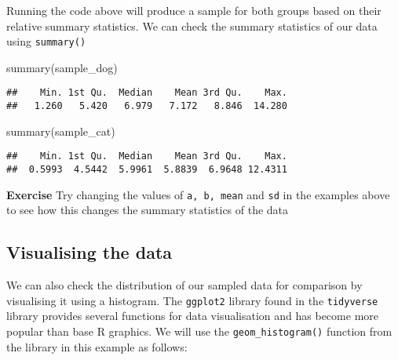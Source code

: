 \documentclass[
]{book}
\newenvironment{Shaded}{\begin{snugshade}}{\end{snugshade}}
\newcommand{\FunctionTok}[1]{\textcolor[rgb]{0.00,0.00,0.00}{#1}}
\newcommand{\NormalTok}[1]{#1}
\begin{document}
Running the code above will produce a sample for both groups based on their relative summary statistics. We can check the summary statistics of our data using \texttt{summary()}

\begin{Shaded}
\begin{Highlighting}[]
\FunctionTok{summary}\NormalTok{(sample\_dog)}
\end{Highlighting}
\end{Shaded}

\begin{verbatim}
##    Min. 1st Qu.  Median    Mean 3rd Qu.    Max. 
##   1.260   5.420   6.979   7.172   8.846  14.280
\end{verbatim}

\begin{Shaded}
\begin{Highlighting}[]
\FunctionTok{summary}\NormalTok{(sample\_cat)}
\end{Highlighting}
\end{Shaded}

\begin{verbatim}
##    Min. 1st Qu.  Median    Mean 3rd Qu.    Max. 
##  0.5993  4.5442  5.9961  5.8839  6.9648 12.4311
\end{verbatim}

\textbf{Exercise}
Try changing the values of \texttt{a,\ b,\ mean} and \texttt{sd} in the examples above to see how this changes the summary statistics of the data

\hypertarget{visualising-the-data}{%
\subsection{Visualising the data}\label{visualising-the-data}}

We can also check the distribution of our sampled data for comparison by visualising it using a histogram. The \texttt{ggplot2} library found in the \texttt{tidyverse} library provides several functions for data visualisation and has become more popular than base R graphics. We will use the \texttt{geom\_histogram()} function from the library in this example as follows:
\end{document}
